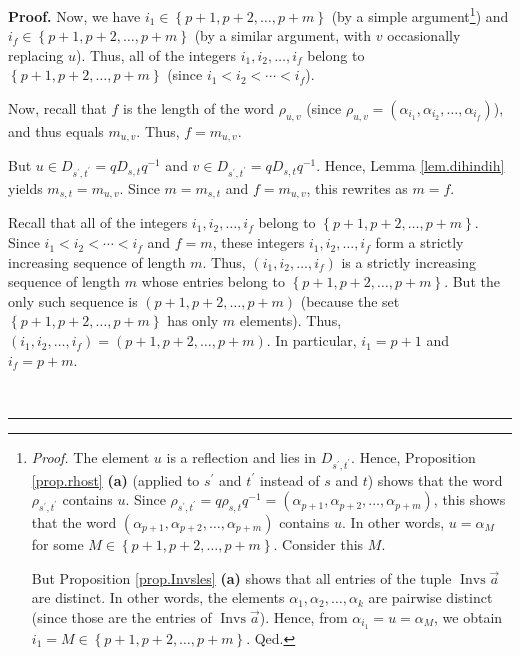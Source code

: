 \documentclass[numbers=enddot,12pt,final,onecolumn,notitlepage,abstracton]{scrartcl}%
\theoremstyle{definition}
\newenvironment{proof}[1][Proof]{\noindent\textbf{#1.} }{\ \rule{0.5em}{0.5em}}
\begin{document}
\begin{proof}
Now, we have $i_{1}\in\left\{  p+1,p+2,\ldots,p+m\right\}  $ (by a simple
argument\footnote{\textit{Proof.} The element $u$ is a reflection and lies in
$D_{s^{\prime},t^{\prime}}$. Hence, Proposition \ref{prop.rhost} \textbf{(a)}
(applied to $s^{\prime}$ and $t^{\prime}$ instead of $s$ and $t$) shows that
the word $\rho_{s^{\prime},t^{\prime}}$ contains $u$. Since $\rho_{s^{\prime
},t^{\prime}}=q\rho_{s,t}q^{-1}=\left(  \alpha_{p+1},\alpha_{p+2}%
,\ldots,\alpha_{p+m}\right)  $, this shows that the word $\left(  \alpha
_{p+1},\alpha_{p+2},\ldots,\alpha_{p+m}\right)  $ contains $u$. In other
words, $u=\alpha_{M}$ for some $M\in\left\{  p+1,p+2,\ldots,p+m\right\}  $.
Consider this $M$.
\par
But Proposition \ref{prop.Invsles} \textbf{(a)} shows that all entries of the
tuple $\operatorname*{Invs}\overrightarrow{a}$ are distinct. In other words,
the elements $\alpha_{1},\alpha_{2},\ldots,\alpha_{k}$ are pairwise distinct
(since those are the entries of $\operatorname*{Invs}\overrightarrow{a}$).
Hence, from $\alpha_{i_{1}}=u=\alpha_{M}$, we obtain $i_{1}=M\in\left\{
p+1,p+2,\ldots,p+m\right\}  $. Qed.}) and $i_{f}\in\left\{  p+1,p+2,\ldots
,p+m\right\}  $ (by a similar argument, with $v$ occasionally replacing $u$).
Thus, all of the integers $i_{1},i_{2},\ldots,i_{f}$ belong to $\left\{
p+1,p+2,\ldots,p+m\right\}  $ (since $i_{1}<i_{2}<\cdots<i_{f}$).

Now, recall that $f$ is the length of the word $\rho_{u,v}$ (since $\rho
_{u,v}=\left(  \alpha_{i_{1}},\alpha_{i_{2}},\ldots,\alpha_{i_{f}}\right)  $),
and thus equals $m_{u,v}$. Thus, $f=m_{u,v}$.

But $u\in D_{s^{\prime},t^{\prime}}=qD_{s,t}q^{-1}$ and $v\in D_{s^{\prime
},t^{\prime}}=qD_{s,t}q^{-1}$. Hence, Lemma \ref{lem.dihindih} yields
$m_{s,t}=m_{u,v}$. Since $m=m_{s,t}$ and $f=m_{u,v}$, this rewrites as $m=f$.

Recall that all of the integers $i_{1},i_{2},\ldots,i_{f}$ belong to $\left\{
p+1,p+2,\ldots,p+m\right\}  $. Since $i_{1}<i_{2}<\cdots<i_{f}$ and $f=m$,
these integers $i_{1},i_{2},\ldots,i_{f}$ form a strictly increasing sequence
of length $m$. Thus, $\left(  i_{1},i_{2},\ldots,i_{f}\right)  $ is a strictly
increasing sequence of length $m$ whose entries belong to $\left\{
p+1,p+2,\ldots,p+m\right\}  $. But the only such sequence is $\left(
p+1,p+2,\ldots,p+m\right)  $ (because the set $\left\{  p+1,p+2,\ldots
,p+m\right\}  $ has only $m$ elements). Thus, $\left(  i_{1},i_{2}%
,\ldots,i_{f}\right)  =\left(  p+1,p+2,\ldots,p+m\right)  $. In particular,
$i_{1}=p+1$ and $i_{f}=p+m$.


\end{proof}
\end{document}
